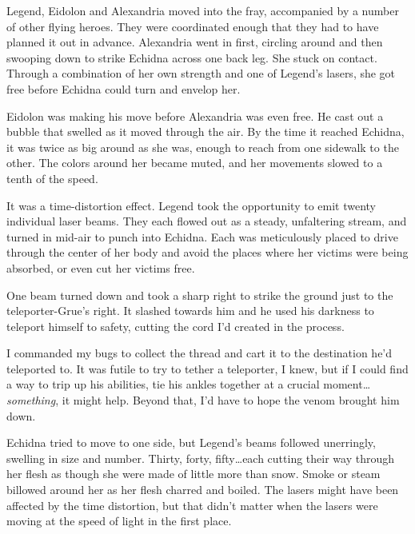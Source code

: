 Legend, Eidolon and Alexandria moved into the fray, accompanied by a number of other flying heroes.  They were coordinated enough that they had to have planned it out in advance.  Alexandria went in first, circling around and then swooping down to strike Echidna across one back leg.  She stuck on contact.  Through a combination of her own strength and one of Legend's lasers, she got free before Echidna could turn and envelop her.



Eidolon was making his move before Alexandria was even free.  He cast out a bubble that swelled as it moved through the air.  By the time it reached Echidna, it was twice as big around as she was, enough to reach from one sidewalk to the other.  The colors around her became muted, and her movements slowed to a tenth of the speed.



It was a time-distortion effect.  Legend took the opportunity to emit twenty individual laser beams.  They each flowed out as a steady, unfaltering stream, and turned in mid-air to punch into Echidna.  Each was meticulously placed to drive through the center of her body and avoid the places where her victims were being absorbed, or even cut her victims free.



One beam turned down and took a sharp right to strike the ground just to the teleporter-Grue's right.  It slashed towards him and he used his darkness to teleport himself to safety, cutting the cord I'd created in the process.



I commanded my bugs to collect the thread and cart it to the destination he'd teleported to.  It was futile to try to tether a teleporter, I knew, but if I could find a way to trip up his abilities, tie his ankles together at a crucial moment\ldots \emph{something}, it might help.  Beyond that, I'd have to hope the venom brought him down.



Echidna tried to move to one side, but Legend's beams followed unerringly, swelling in size and number.  Thirty, forty, fifty\ldots each cutting their way through her flesh as though she were made of little more than snow.  Smoke or steam billowed around her as her flesh charred and boiled.  The lasers might have been affected by the time distortion, but that didn't matter when the lasers were moving at the speed of light in the first place.



